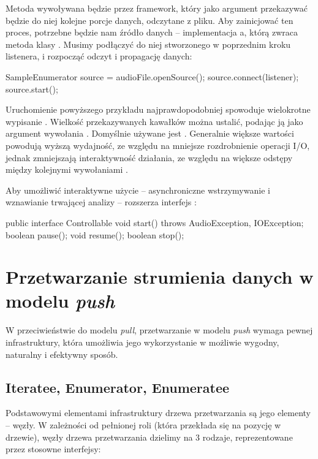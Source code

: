 Metoda  wywoływana będzie przez framework, który jako argument przekazywać będzie do niej
kolejne porcje danych, odczytane z pliku. Aby zainicjować ten proces, potrzebne będzie nam źródło
danych -- implementacja a, którą zwraca metoda  klasy
.  Musimy podłączyć do niej stworzonego w poprzednim kroku listenera, i rozpocząć
odczyt i propagację danych:

\begin{java}
SampleEnumerator source = audioFile.openSource();
source.connect(listener);
source.start();
\end{java}

Uruchomienie powyższego przykładu najprawdopodobniej spowoduje wielokrotne wypisanie . Wielkość przekazywanych kawałków można ustalić, podając ją jako argument wywołania
. Domyślnie używane jest . Generalnie większe
wartości powodują wyższą wydajność, ze względu na mniejsze rozdrobnienie operacji I/O, jednak
zmniejszają interaktywność działania, ze względu na większe odstępy między kolejnymi wywołaniami
.

Aby umożliwić interaktywne użycie -- asynchroniczne wstrzymywanie i wznawianie trwającej analizy --
 rozszerza interfejs :

\begin{java}
public interface Controllable {
    void start() throws AudioException, IOException;
    boolean pause();
    void resume();
    boolean stop();
}
\end{java}

\section{Przetwarzanie strumienia danych w modelu \emph{push}}

W przeciwieństwie do modelu \emph{pull}, przetwarzanie w modelu \emph{push} wymaga pewnej
infrastruktury, która umożliwia jego wykorzystanie w możliwie wygodny, naturalny i efektywny sposób.

\subsection{Iteratee, Enumerator, Enumeratee}

Podstawowymi elementami infrastruktury drzewa przetwarzania są jego elementy -- węzły. W zależności
od pełnionej roli (która przekłada się na pozycję w drzewie), węzły drzewa przetwarzania dzielimy na
3 rodzaje, reprezentowane przez stosowne interfejsy:

